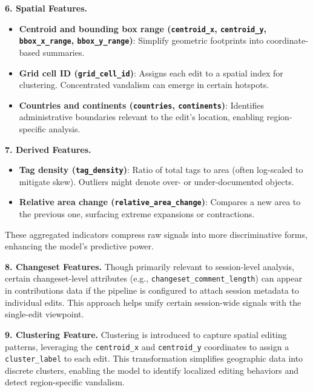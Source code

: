 \documentclass[
    13pt, %
    a4paper, %
    DIV14, %
    listof=totoc, %
    bibliography=totoc, %
    index=totoc, %
    headsepline
]{scrreprt}
\begin{document}
\vspace{1em}
\noindent
\textbf{6. Spatial Features.}
\begin{itemize}
  \item \textbf{Centroid and bounding box range (\texttt{centroid\_x}, \texttt{centroid\_y}, \texttt{bbox\_x\_range}, \texttt{bbox\_y\_range})}: Simplify geometric footprints into coordinate-based summaries.
  \item \textbf{Grid cell ID (\texttt{grid\_cell\_id})}: Assigns each edit to a spatial index for clustering. Concentrated vandalism can emerge in certain hotspots.
  \item \textbf{Countries and continents (\texttt{countries}, \texttt{continents})}: Identifies administrative boundaries relevant to the edit’s location, enabling region-specific analysis.
\end{itemize}

\vspace{1em}
\noindent
\textbf{7. Derived Features.}
\begin{itemize}
  \item \textbf{Tag density (\texttt{tag\_density})}: Ratio of total tags to area (often log-scaled to mitigate skew). Outliers might denote over- or under-documented objects.
  \item \textbf{Relative area change (\texttt{relative\_area\_change})}: Compares a new area to the previous one, surfacing extreme expansions or contractions.
\end{itemize}
These aggregated indicators compress raw signals into more discriminative forms, enhancing the model’s predictive power.

\vspace{1em}
\noindent
\textbf{8. Changeset Features.}
Though primarily relevant to session-level analysis, certain changeset-level attributes (e.g., \texttt{changeset\_comment\_length}) can appear in contributions data if the pipeline is configured to attach session metadata to individual edits. This approach helps unify certain session-wide signals with the single-edit viewpoint.

\vspace{1em}
\noindent
\textbf{9. Clustering Feature.}
Clustering is introduced to capture spatial editing patterns, leveraging the \texttt{centroid\_x} and \texttt{centroid\_y} coordinates to assign a \texttt{cluster\_label} to each edit. This transformation simplifies geographic data into discrete clusters, enabling the model to identify localized editing behaviors and detect region-specific vandalism.
\end{document}
